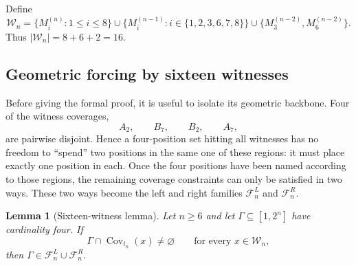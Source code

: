 \documentclass[11pt,a4paper]{article}
\newtheorem{lemma}[theorem]{Lemma}
\theoremstyle{definition}\newtheorem{definition}[theorem]{Definition}
\theoremstyle{remark}\newtheorem{remark}[theorem]{Remark}
\newcommand{\Cov}{\operatorname{Cov}}
\newcommand{\FL}{\mathcal{F}^{L}}
\newcommand{\FR}{\mathcal{F}^{R}}
\begin{document}
Define
\[
\mathcal W_n=
\{M_i^{(n)}:1\le i\le8\}
\cup
\{M_i^{(n-1)}:i\in\{1,2,3,6,7,8\}\}
\cup
\{M_3^{(n-2)},M_6^{(n-2)}\}.
\]
Thus $|\mathcal W_n|=8+6+2=16$.

\subsection{Geometric forcing by sixteen witnesses}
\label{subsec:sixteen-witness}

Before giving the formal proof, it is useful to isolate its geometric backbone.  Four of the witness coverages,
\[
 A_2,\qquad B_7,\qquad B_2,\qquad A_7,
\]
are pairwise disjoint.  Hence a four-position set hitting all witnesses has no freedom to ``spend'' two positions in the same one of these regions: it must place exactly one position in each.  Once the four positions have been named according to those regions, the remaining coverage constraints can only be satisfied in two ways.  These two ways become the left and right families $\FL_n$ and $\FR_n$.

\begin{lemma}[Sixteen-witness lemma]
\label{lem:sixteen-witness}
Let $n\ge6$ and let $\Gamma\subseteq[1,2^n]$ have cardinality four.  If
\[
 \Gamma\cap\Cov_{t_n}(x)\ne\varnothing
 \qquad\text{for every }x\in\mathcal W_n,
\]
then
$
 \Gamma\in\FL_n\cup\FR_n.
$
\end{lemma}
\end{document}
